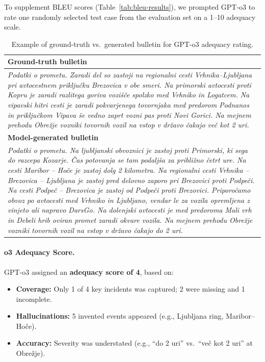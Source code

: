 \documentclass[fleqn,moreauthors,10pt]{ds_report}
\begin{document}
To supplement BLEU scores (Table~\ref{tab:bleu-results}), we prompted GPT-o3 to rate one randomly selected test case from the evaluation set on a 1–10 adequacy scale.

\begin{table}[!ht]
\centering
\footnotesize
\renewcommand{\arraystretch}{1.15}
\setlength{\tabcolsep}{4pt}
\begin{tabularx}{\linewidth}{@{}X@{}}
\toprule
\textbf{Ground-truth bulletin} \\
\midrule
\textit{Podatki o prometu. Zaradi del so zastoji na regionalni cesti Vrhnika–Ljubljana pri avtocestnem priključku Brezovica v obe smeri. Na primorski avtocesti proti Kopru je zaradi razlitega goriva vozišče spolzko med Vrhniko in Logatcem. Na vipavski hitri cesti je zaradi pokvarjenega tovornjaka med predorom Podnanos in priključkom Vipava še vedno zaprt vozni pas proti Novi Gorici. Na mejnem prehodu Obrežje vozniki tovornih vozil na vstop v državo čakajo več kot 2 uri.} \\[0.8em]
\midrule
\textbf{Model-generated bulletin} \\
\midrule
\textit{Podatki o prometu. Na ljubljanski obvoznici je zastoj proti Primorski, ki sega do razcepa Kozarje. Čas potovanja se tam podaljša za približno četrt ure. Na cesti Maribor – Hoče je zastoj dolg 2 kilometra. Na regionalni cesti Vrhnika – Brezovica – Ljubljana je zastoj pred delovno zaporo pri Brezovici proti Podpeči. Na cesti Podpeč – Brezovica je zastoj od Podpeči proti Brezovici. Priporočamo obvoz po avtocesti med Vrhniko in Ljubljano, vendar le za vozila opremljena z vinjeto ali napravo DarsGo. Na dolenjski avtocesti je med predoroma Mali vrh in Debeli hrib oviran promet zaradi okvare vozila. Na mejnem prehodu Obrežje vozniki tovornih vozil na vstop v državo čakajo do 2 uri.} \\
\bottomrule
\end{tabularx}
\caption{Example of ground-truth vs.\ generated bulletin for GPT-o3 adequacy rating.}
\label{tab:qualitative}
\end{table}

\paragraph{o3 Adequacy Score.}
GPT-o3 assigned an \textbf{adequacy score of 4}, based on:

\begin{itemize}[noitemsep, topsep=0pt]
  \item \textbf{Coverage:} Only 1 of 4 key incidents was captured; 2 were missing and 1 incomplete.
  \item \textbf{Hallucinations:} 5 invented events appeared (e.g., Ljubljana ring, Maribor–Hoče).
  \item \textbf{Accuracy:} Severity was understated (e.g., “do 2 uri” vs.\ “več kot 2 uri” at Obrežje).
\end{itemize}
\end{document}

